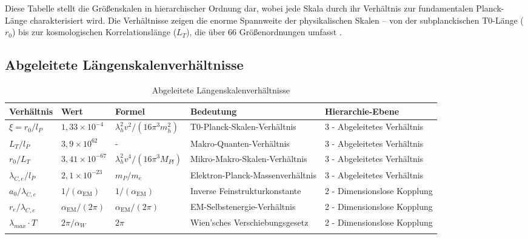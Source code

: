 \documentclass[12pt,a4paper]{article}
\newcommand{\alphaEM}{\alpha_{\text{EM}}}
\begin{document}
	Diese Tabelle stellt die Größenskalen in hierarchischer Ordnung dar, wobei jede Skala durch ihr Verhältnis zur fundamentalen Planck-Länge charakterisiert wird. Die Verhältnisse zeigen die enorme Spannweite der physikalischen Skalen -- von der subplanckischen T0-Länge ($r_0$) bis zur kosmologischen Korrelationslänge ($L_T$), die über 66 Größenordnungen umfasst \cite{pascher_emergente_2025}.
	
	\subsection{Abgeleitete Längenskalenverhältnisse}
	
	\begin{table}[ht]
		\centering
		\begin{adjustbox}{scale=0.75}
			\begin{tabular}{lllll}
				\hline
				\textbf{Verhältnis} & \textbf{Wert} & \textbf{Formel} & \textbf{Bedeutung} & \textbf{Hierarchie-Ebene} \\
				\hline
				$\xi = r_0/l_P$ & $1,33 \times 10^{-4}$ & $\lambda_h^2v^2/(16\pi^3m_h^2)$ & T0-Planck-Skalen-Verhältnis & 3 - Abgeleitetes Verhältnis \\
				$L_T/l_P$ & $3,9 \times 10^{62}$ & - & Makro-Quanten-Verhältnis & 3 - Abgeleitetes Verhältnis \\
				$r_0/L_T$ & $3,41 \times 10^{-67}$ & $\lambda_h^2v^4/(16\pi^3M_{Pl})$ & Mikro-Makro-Skalen-Verhältnis & 3 - Abgeleitetes Verhältnis \\
				$\lambda_{C,e}/l_P$ & $2,1 \times 10^{-23}$ & $m_P/m_e$ & Elektron-Planck-Massenverhältnis & 3 - Abgeleitetes Verhältnis \\
				$a_0/\lambda_{C,e}$ & $1/(\alphaEM)$ & $1/(\alphaEM)$ & Inverse Feinstrukturkonstante & 2 - Dimensionslose Kopplung \\
				$r_e/\lambda_{C,e}$ & $\alphaEM/(2\pi)$ & $\alphaEM/(2\pi)$ & EM-Selbstenergie-Verhältnis & 2 - Dimensionslose Kopplung \\
				$\lambda_{max} \cdot T$ & $2\pi/\alpha_W$ & $2\pi$ & Wien'sches Verschiebungsgesetz & 2 - Dimensionslose Kopplung \\
				\hline
				 \multicolumn{4}{c}{} \\
				\hline
			\end{tabular}
		\end{adjustbox}
		\caption{Abgeleitete Längenskalenverhältnisse}
		\label{tab:length_ratios}
	\end{table}
	
\end{document}
